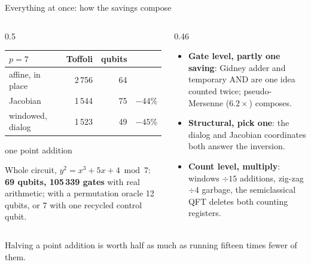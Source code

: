 \documentclass[aspectratio=169,11pt]{beamer}
\begin{document}
\begin{frame}{Everything at once: how the savings compose}
  \begin{columns}[T]
    \begin{column}{0.5\textwidth}
      \centering\footnotesize
      \renewcommand{\arraystretch}{1.1}
      \begin{tabular}{@{}lrrr@{}}
        \toprule
        $p=7$ & Toffoli & qubits & \\
        \midrule
        affine, in place & 2\,756 & 64 & \\
        Jacobian & 1\,544 & 75 & $-44\%$ \\
        windowed, dialog & 1\,523 & 49 & $-45\%$ \\
        \bottomrule
      \end{tabular}\par
      {\scriptsize one point addition}\par
      \vskip2mm
      \raggedright\small
      Whole circuit, $y^2=x^3+5x+4 \bmod 7$: \textbf{69 qubits, 105\,339 gates} with real arithmetic; with a permutation oracle 12 qubits, or 7 with one recycled control qubit.
    \end{column}
    \begin{column}{0.46\textwidth}
      \small
      \begin{itemize}\setlength{\itemsep}{1mm}
        \item \textbf{Gate level, partly one saving}: Gidney adder and temporary AND are one idea counted twice; pseudo-Mersenne ($6.2\times$) composes.
        \item \textbf{Structural, pick one}: the dialog and Jacobian coordinates both answer the inversion.
        \item \textbf{Count level, multiply}: windows $\div15$ additions, zig-zag $\div4$ garbage, the semiclassical QFT deletes both counting registers.
      \end{itemize}
    \end{column}
  \end{columns}
  \begin{takeaway}Halving a point addition is worth half as much as running fifteen times fewer of them.\end{takeaway}
\end{frame}
\end{document}
